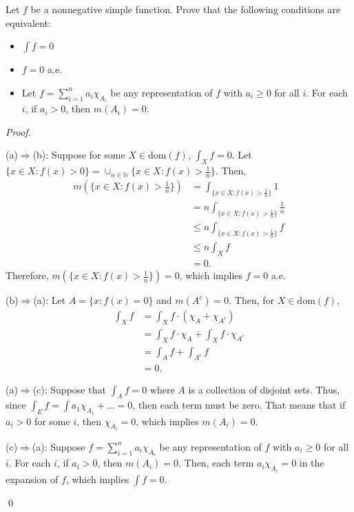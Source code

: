 \documentclass[12pt]{article}
\newenvironment{problem}[2][Problem]{\begin{trivlist}
\item[\hskip \labelsep {\bfseries #1}\hskip \labelsep {\bfseries
#2.}]}{\end{trivlist}}
\newenvironment{sol}
    {\emph{Proof.}
    }
    {
    \qed
    }
\begin{document}
\begin{problem}{47}
  Let $f$ be a nonnegative simple function. Prove that the following conditions are equivalent:
  \begin{itemize}
    \item[(a)] $\int f = 0$
    \item[(b)] $f = 0$ a.e.
    \item[(c)] Let $f = \sum_{i = 1}^{n}a_i\chi_{A_i}$ be any representation of $f$ with $a_i \geq 0$ for all $i$. For each $i$, if $a_i > 0$, then $m(A_i) = 0$.
  \end{itemize}

  \begin{sol}
    (a)$\Longrightarrow$(b): Suppose for some $X \in \text{dom}(f)$, $\int_X f = 0$. Let $\{x \in X : f(x) > 0\} = \cup_{n \in \mathbb{N}}\{x \in X : f(x) > \frac{1}{n}\}$. Then, 
    \begin{align*}
      m(\{x \in X : f(x) > \frac{1}{n}\}) &= \int_{\{x \in X : f(x) > \frac{1}{n}\}}1 \\
      &= n \int_{\{x \in X : f(x) > \frac{1}{n}\}} \frac{1}{n} \\
      &\leq n \int_{\{x \in X : f(x) > \frac{1}{n}\}} f \\
      &\leq n \int_{X} f \\
      &=0.
    \end{align*}
    Therefore, $m(\{x \in X : f(x) > \frac{1}{n}\}) = 0$, which implies $f = 0$ a.e.

    \vspace{1em}

    (b)$\Longrightarrow$(a): Let $A = \{x : f(x) = 0\}$ and $m(A^c) = 0$. Then, for $X \in \text{dom}(f)$, 
    \begin{align*}
      \int_X f &= \int_X f \cdot (\chi_A + \chi_{A^{c}}) \\
      &= \int_X f \cdot \chi_A + \int_X f \cdot \chi_{A^{c}} \tag*{(Since $A \cap A^c = \emptyset$)} \\
      &= \int_A f + \int_{A^c} f \\
      &= 0.
    \end{align*}

    \vspace{1em}

    (a)$\Longrightarrow$(c): Suppose that $\int_A f = 0$ where $A$ is a collection of disjoint sets. Thus, since $\int_E f = \int a_1\chi_{A_1} + \dots = 0$, then each term must be zero. That means that if $a_i > 0$ for some $i$, then $\chi_{A_i} = 0$, which implies $m(A_i) = 0$. 

    \vspace{1em}

    (c)$\Longrightarrow$(a): Suppose $f = \sum_{i = 1}^{n}a_i\chi_{A_i}$ be any representation of $f$ with $a_i \geq 0$ for all $i$. For each $i$, if $a_i > 0$, then $m(A_i) = 0$. Then, each term $a_i\chi_{A_i} = 0$ in the expansion of $f$, which implies $\int f = 0$.
  \end{sol}
\end{problem}
\end{document}
